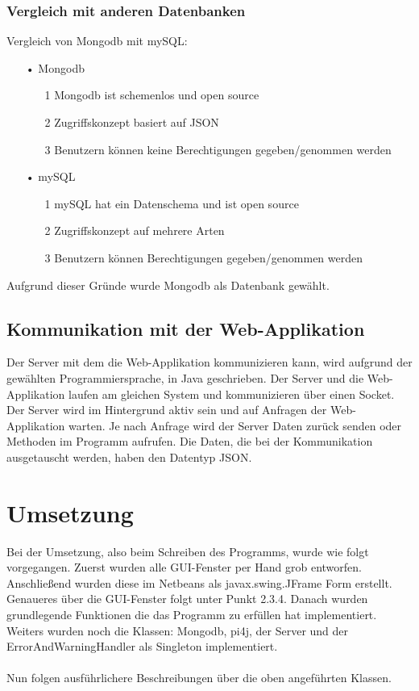 \subsubsection{Vergleich mit anderen Datenbanken}
Vergleich von Mongodb mit mySQL:
\begin{itemize}
\item[•] Mongodb
\begin{itemize}
\item[1] Mongodb ist schemenlos und open source
\item[2] Zugriffskonzept basiert auf \ac{JSON}
\item[3] Benutzern können keine Berechtigungen gegeben/genommen werden
\end{itemize}
\item[•] mySQL
\begin{itemize}
\item[1] mySQL hat ein Datenschema und ist open source
\item[2] Zugriffskonzept auf mehrere Arten
\item[3] Benutzern können Berechtigungen gegeben/genommen werden
\end{itemize}
\end{itemize}

Aufgrund dieser Gründe wurde Mongodb als Datenbank gewählt.

\subsection{Kommunikation mit der Web-Applikation}
Der Server mit dem die Web-Applikation kommunizieren kann, wird aufgrund der gewählten Programmiersprache, in Java geschrieben. Der Server und die Web-Applikation laufen am gleichen System und kommunizieren über einen Socket. Der Server wird im Hintergrund aktiv sein und auf Anfragen der Web-Applikation warten. Je nach Anfrage wird der Server Daten zurück senden oder Methoden im Programm aufrufen. Die Daten, die bei der Kommunikation ausgetauscht werden, haben den Datentyp \ac{JSON}.

\newpage

\section{Umsetzung}
Bei der Umsetzung, also beim Schreiben des Programms, wurde wie folgt vorgegangen. Zuerst wurden alle \ac{GUI}-Fenster per Hand grob entworfen. Anschließend wurden diese im Netbeans als javax.swing.JFrame Form erstellt. Genaueres über die \ac{GUI}-Fenster folgt unter Punkt 2.3.4. Danach wurden grundlegende Funktionen die das Programm zu erfüllen hat implementiert. Weiters wurden noch die Klassen: Mongodb, \ac{pi4j}, der Server und der ErrorAndWarningHandler als Singleton implementiert. 
\\ \\ 
Nun folgen ausführlichere Beschreibungen über die oben angeführten Klassen.

